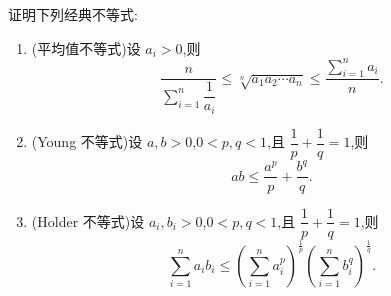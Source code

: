 \documentclass[../数学分析培优讲义.tex]{subfiles}
\begin{document}
\begin{example}[\markstar]
证明下列经典不等式:
\begin{enumerate}[label=(\arabic*)]
    \item (平均值不等式)设 $a_i>0$,则
    \[
        \dfrac{n}{\displaystyle\sum\limits_{i=1}^n\dfrac{1}{a_i}}
        \leq\sqrt[n]{a_1a_2\cdots a_n}
        \leq\dfrac{\displaystyle\sum\limits_{i=1}^n a_i}{n}.
    \]
    \item (Young 不等式)设 $a,b>0$,$0<p,q<1$,且 $\dfrac{1}{p}+\dfrac{1}{q}=1$,则
    \[
        ab\leq\dfrac{a^p}{p}+\dfrac{b^q}{q}.
    \]
    \item (Holder 不等式)设 $a_i,b_i>0$,$0<p,q<1$,且 $\dfrac{1}{p}+\dfrac{1}{q}=1$,则
    \[
        \sum\limits_{i=1}^n a_i b_i
        \leq
        \left(\sum\limits_{i=1}^n a_i^p\right)^{\frac{1}{p}}
        \left(\sum\limits_{i=1}^n b_i^q\right)^{\frac{1}{q}}.
    \]
\end{enumerate}
\end{example}
\exampleblank
\end{document}
